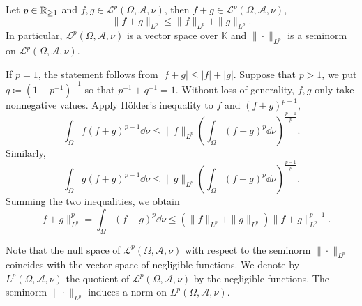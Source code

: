 \begin{theoremenv}\label{thm:8.2.4}
    Let $p \in \mathbb{R}_{\ge 1}$ and $f,g \in \mathcal{L}^{p}(\Omega,\mathscr{A},\nu)$, then $f + g \in \mathcal{L}^{p}(\Omega,\mathscr{A},\nu)$,
    $$\|f + g\|_{L^{p}} \le \|f\|_{L^{p}} + \|g\|_{L^{p}}.$$
    In particular, $\mathcal{L}^{p}(\Omega,\mathscr{A},\nu)$ is a vector space over $\mathbb{K}$ and $\|\cdot\|_{L^{p}}$ is a seminorm on $\mathcal{L}^{p}(\Omega,\mathscr{A},\nu).$
\end{theoremenv}
\begin{proofenv}
    If $p = 1$, the statement follows from $|f + g| \le |f| + |g|$.
    Suppose that $p > 1$, we put $q \coloneq (1 - p^{-1})^{-1}$ so that $p^{-1} + q^{-1} = 1$.
    Without loss of generality, $f,g$ only take nonnegative values.
    Apply Hölder's inequality to $f$ and $(f + g)^{p-1}$,
    $$\int_{\Omega} f(f + g)^{p-1} \dd \nu \le \|f\|_{L^p} \left(\int_{\Omega} (f + g)^{p} \dd \nu\right)^{\frac{p-1}{p}}.$$
    Similarly,
    $$\int_{\Omega} g(f + g)^{p-1} \dd \nu \le \|g\|_{L^p} \left(\int_{\Omega} (f + g)^{p} \dd \nu\right)^{\frac{p-1}{p}}.$$
    Summing the two inequalities, we obtain
    $$\|f+g\|^p_{L^p} = \int_{\Omega} (f + g)^{p} \dd \nu \le (\|f\|_{L^p} + \|g\|_{L^p}) \|f+g\|_{L^p}^{p-1}.$$
\end{proofenv}

\begin{remark}
    Note that the null space of $\mathcal{L}^p(\Omega,\mathscr{A},\nu)$ with respect to the seminorm $\|\cdot\|_{L^p}$ coincides with the vector space of negligible functions.
    We denote by $L^p(\Omega,\mathscr{A},\nu)$ the quotient of $\mathcal{L}^p(\Omega,\mathscr{A},\nu)$ by the negligible functions.
    The seminorm $\|\cdot\|_{L^p}$ induces a norm on $L^p(\Omega,\mathscr{A},\nu)$.
\end{remark}

